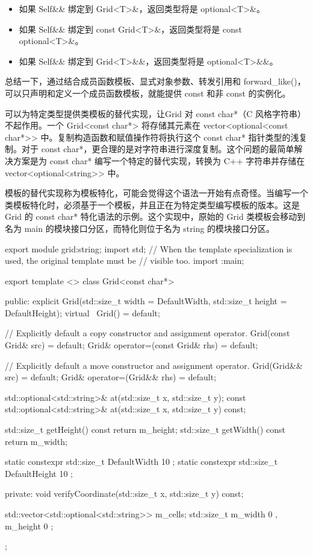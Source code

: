 \begin{itemize}
\item
如果 Self\&\& 绑定到 Grid<T>\&，返回类型将是 optional<T>\&。

\item
如果 Self\&\& 绑定到 const Grid<T>\&，返回类型将是 const optional<T>\&。

\item
如果 Self\&\& 绑定到 Grid<T>\&\&，返回类型将是 optional<T>\&\&。
\end{itemize}

总结一下，通过结合成员函数模板、显式对象参数、转发引用和 forward\_like()，可以只声明和定义一个成员函数模板，就能提供 const 和非 const 的实例化。


可以为特定类型提供类模板的替代实现，让Grid 对 const char*（C 风格字符串）不起作用。一个 Grid<const char*> 将存储其元素在 vector<optional<const char*>{}> 中。复制构造函数和赋值操作符将执行这个 const char* 指针类型的浅复制。对于 const char*，更合理的是对字符串进行深度复制。这个问题的最简单解决方案是为 const char* 编写一个特定的替代实现，转换为 C++ 字符串并存储在 vector<optional<string>{}> 中。

模板的替代实现称为模板特化，可能会觉得这个语法一开始有点奇怪。当编写一个类模板特化时，必须基于一个模板，并且正在为特定类型编写模板的版本。这是 Grid 的 const char* 特化语法的示例。这个实现中，原始的 Grid 类模板会移动到名为 main 的模块接口分区，而特化则位于名为 string 的模块接口分区。

\begin{cpp}
export module grid:string;
import std;
// When the template specialization is used, the original template must be
// visible too.
import :main;

export template <>
class Grid<const char*>
{
    public:
        explicit Grid(std::size_t width = DefaultWidth,
            std::size_t height = DefaultHeight);
        virtual ~Grid() = default;

        // Explicitly default a copy constructor and assignment operator.
        Grid(const Grid& src) = default;
        Grid& operator=(const Grid& rhs) = default;

        // Explicitly default a move constructor and assignment operator.
        Grid(Grid&& src) = default;
        Grid& operator=(Grid&& rhs) = default;

        std::optional<std::string>& at(std::size_t x, std::size_t y);
        const std::optional<std::string>& at(std::size_t x, std::size_t y) const;

        std::size_t getHeight() const { return m_height; }
        std::size_t getWidth() const { return m_width; }

        static constexpr std::size_t DefaultWidth { 10 };
        static constexpr std::size_t DefaultHeight { 10 };

    private:
        void verifyCoordinate(std::size_t x, std::size_t y) const;

        std::vector<std::optional<std::string>> m_cells;
        std::size_t m_width { 0 }, m_height { 0 };
};
\end{cpp}

